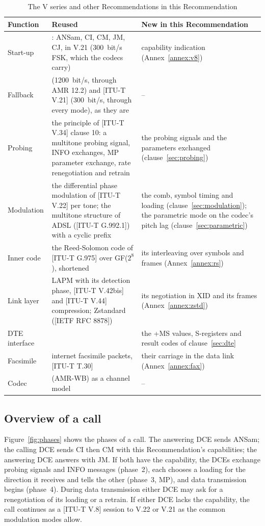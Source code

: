 \documentclass[a4paper,11pt]{article}
\newcounter{annex}
\newcommand{\rec}[1]{[ITU-T #1]}
\newcommand{\ietf}[1]{[IETF RFC #1]}
\newcommand{\thd}[1]{\textbf{#1}}
\begin{document}
\begin{table}[htbp]
\caption{The V series and other Recommendations in this Recommendation}
\label{tab:reuse}
\small
\begin{tabularx}{\textwidth}{>{\raggedright\arraybackslash}p{3.0cm}>{\raggedright\arraybackslash}X>{\raggedright\arraybackslash}p{4.8cm}}
\toprule
\rowcolor{ituhead}\thd{Function} & \thd{Reused} & \thd{New in this Recommendation} \\
\midrule
Start-up & \rec{V.8}: ANSam, CI, CM, JM, CJ, in V.21 (300~bit/s FSK, which the codecs carry) & capability indication (Annex~\ref{annex:v8}) \\
Fallback & \rec{V.22} (1200~bit/s, through AMR 12.2) and \rec{V.21} (300~bit/s, through every mode), as they are & -- \\
Probing & the principle of \rec{V.34} clause 10: a multitone probing signal, INFO exchanges, MP parameter exchange, rate renegotiation and retrain & the probing signals and the parameters exchanged (clause~\ref{sec:probing}) \\
Modulation & the differential phase modulation of \rec{V.22} per tone; the multitone structure of ADSL (\rec{G.992.1}) with a cyclic prefix & the comb, symbol timing and loading (clause~\ref{sec:modulation}); the parametric mode on the codec's pitch lag (clause~\ref{sec:parametric}) \\
Inner code & the Reed-Solomon code of \rec{G.975} over GF($2^8$), shortened & its interleaving over symbols and frames (Annex~\ref{annex:rs}) \\
Link layer & \rec{V.42} LAPM with its detection phase, \rec{V.42bis} and \rec{V.44} compression; Zstandard (\ietf{8878}) & its negotiation in XID and its frames (Annex~\ref{annex:zstd}) \\
DTE interface & \rec{V.250} & the +MS values, S-registers and result codes of clause~\ref{sec:dte} \\
Facsimile & \rec{T.38} internet facsimile packets, \rec{T.30} & their carriage in the data link (Annex~\ref{annex:fax}) \\
Codec & \rec{G.722.2} (AMR-WB) as a channel model & -- \\
\bottomrule
\end{tabularx}
\end{table}

\subsection{Overview of a call}
Figure~\ref{fig:phases} shows the phases of a call.  The answering DCE
sends ANSam; the calling DCE sends CI then CM with this Recommendation's
capabilities; the answering DCE answers with JM.  If both have the
capability, the DCEs exchange probing signals and INFO messages (phase~2),
each chooses a loading for the direction it receives and tells the other
(phase~3, MP), and data transmission begins (phase~4).  During data
transmission either DCE may ask for a renegotiation of its loading or a
retrain.  If either DCE lacks the capability, the call continues as a
\rec{V.8} session to V.22 or V.21 as the common modulation modes allow.
\end{document}
